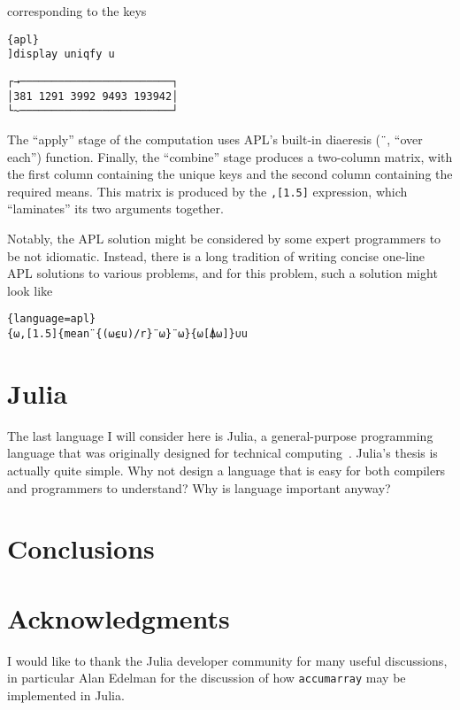 \documentclass[11pt]{asaproc}
\begin{document}
corresponding to the keys

\begin{lstlisting}{apl}
]display uniqfy u
\end{lstlisting}
\begin{verbatim}
┌→────────────────────────┐
│381 1291 3992 9493 193942│
└~────────────────────────┘
\end{verbatim}

The ``apply'' stage of the computation uses APL's built-in diaeresis
(\lstinline|¨|, ``over each'') function. Finally, the ``combine'' stage
produces a two-column matrix, with the first column containing the unique keys
and the second column containing the required means. This matrix is produced by
the \lstinline|,[1.5]| expression, which ``laminates'' its two arguments
together.

Notably, the APL solution might be considered by some expert programmers to be
not idiomatic. Instead, there is a long tradition of writing concise one-line
APL solutions to various problems, and for this problem, such a solution might
look like

\begin{lstlisting}{language=apl}
{⍵,[1.5]{mean¨{(⍵⍷u)/r}¨⍵}¨⍵}{⍵[⍋⍵]}∪u
\end{lstlisting}



\section{Julia}

The last language I will consider here is Julia, a general-purpose programming
language that was originally designed for technical
computing~\cite{Bezanson2015}.  Julia's thesis
is actually quite simple.  Why not design a language that is easy for both
compilers and programmers to understand?
Why is language important anyway?



\section{Conclusions}

\section*{Acknowledgments}

I would like to thank the Julia developer community for many useful
discussions, in particular Alan Edelman for the discussion of how
\lstinline|accumarray| may be implemented in Julia.


\end{document}
